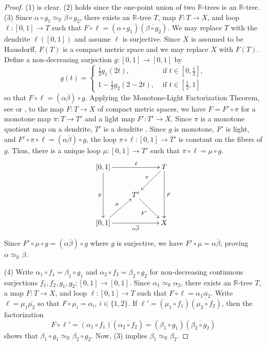 \documentclass[12pt, leqno]{amsart}
\newcommand{\ui}{[0,1]}
\newcommand{\den}{\simeq_{\bbr}}
\newcommand{\bbr}{\mathbb{R}}
\newcommand{\ov}{\overline}
\theoremstyle{definition}\newtheorem{definition}[theorem]{Definition}
\begin{document}
\begin{proof}
(1) is clear. (2) holds since the one-point union of two $\bbr$-trees is an $\bbr$-tree. (3) Since $\alpha\circ g_1\den \beta\circ g_2$, there exists an $\bbr$-tree $T$, map $F:T\to X$, and loop $\ell:\ui \to T$ such that $F\circ\ell=(\alpha\circ g_1) (\ov{\beta\circ g_2})$. We may replace $T$ with the dendrite $\ell(\ui)$ and assume $\ell$ is surjective. Since $X$ is assumed to be Hausdorff, $F(T)$ is a compact metric space \cite[8.17]{Nadler} and we may replace $X$ with $F(T)$. Define a non-decreasing surjection $g:\ui\to \ui$ by
\[g(t)=\begin{cases}
\frac{1}{2}g_1(2t), & \text{ if }t\in[0,\frac{1}{2}],\\
1-\frac{1}{2}g_2(2-2t), & \text{ if }t\in[\frac{1}{2},1]
\end{cases}\]
so that $F\circ \ell=(\alpha\ov{\beta})\circ g$. Applying the Monotone-Light Factorization Theorem, see \cite[Theorem 1]{Eilenberg}  or  \cite[Theorem 2.3]{Whyburn}, to the map $F:T\to X$ of compact metric spaces, we have $F=F'\circ \pi$ for a monotone map $\pi:T\to T'$ and a light map $F':T'\to X$. Since $\pi$ is a monotone quotient map on a dendrite, $T'$ is a dendrite \cite[Exercise 10.52]{Nadler}. Since $g$ is monotone, $F'$ is light, and $F'\circ \pi\circ \ell=(\alpha\ov{\beta})\circ g$, the loop $\pi\circ \ell:\ui\to T'$ is constant on the fibers of $g$. Thus, there is a unique loop $\mu:\ui\to T'$ such that $\pi\circ \ell=\mu\circ g$.
\[\xymatrix{
\ui \ar[dd]_-{g} \ar[rr]^-{\ell} && T \ar[dd]^-{F} \ar[dl]_-{\pi} \\
& T' \ar[dr]_-{F'}\\
\ui \ar[ur]^-{\mu} \ar[rr]_-{\alpha\ov{\beta}} & & X
}\]
Since $F'\circ \mu\circ g=(\alpha\ov{\beta})\circ g$ where $g$ is surjective, we have $F'\circ \mu=\alpha\ov{\beta}$, proving $\alpha\den\beta$.

(4) Write $\alpha_1\circ f_1=\beta_1\circ g_1$ and $\alpha_2\circ f_2=\beta_2\circ g_2$ for non-decreasing continuous surjections $f_1,f_2,g_1,g_2:\ui\to\ui$. Since $\alpha_1\den\alpha_2$, there exists an $\bbr$-tree $T$, a map $F:T\to X$, and loop $\ell:\ui\to T$ such that $F\circ \ell=\alpha_1\ov{\alpha_{2}}$. Write $\ell=\mu_1\ov{\mu_{2}}$ so that $F\circ\mu_i=\alpha_i$, $i\in\{1,2\}$. If $\ell '=(\mu_1\circ f_1)(\ov{\mu_2\circ f_2})$, then the factorization \[F\circ \ell '=(\alpha_1\circ f_1)(\ov{\alpha_2\circ f_2})=(\beta_1\circ g_1)(\ov{\beta_2\circ g_2})\] shows that $\beta_1\circ g_1\den\beta_2\circ g_2$. Now, (3) implies $\beta_1\den\beta_2$.
\end{proof}
\end{document}
